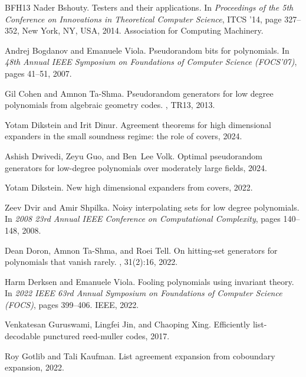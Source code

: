\documentclass[10pt,a4paper]{article}
\begin{document}
\begin{thebibliography}{BFH{\etalchar{+}}13}
Nader Bshouty.
\newblock Testers and their applications.
\newblock In {\em Proceedings of the 5th Conference on Innovations in
  Theoretical Computer Science}, ITCS '14, page 327–352, New York, NY, USA,
  2014. Association for Computing Machinery.

Andrej Bogdanov and Emanuele Viola.
\newblock Pseudorandom bits for polynomials.
\newblock In {\em 48th Annual IEEE Symposium on Foundations of Computer Science
  (FOCS'07)}, pages 41--51, 2007.

Gil Cohen and Amnon Ta-Shma.
\newblock Pseudorandom generators for low degree polynomials from algebraic
  geometry codes.
, TR13, 2013.

Yotam Dikstein and Irit Dinur.
\newblock Agreement theorems for high dimensional expanders in the small
  soundness regime: the role of covers, 2024.

Ashish Dwivedi, Zeyu Guo, and Ben~Lee Volk.
\newblock Optimal pseudorandom generators for low-degree polynomials over
  moderately large fields, 2024.

Yotam Dikstein.
\newblock New high dimensional expanders from covers, 2022.

Zeev Dvir and Amir Shpilka.
\newblock Noisy interpolating sets for low degree polynomials.
\newblock In {\em 2008 23rd Annual IEEE Conference on Computational
  Complexity}, pages 140--148, 2008.

Dean Doron, Amnon Ta{-}Shma, and Roei Tell.
\newblock On hitting-set generators for polynomials that vanish rarely.
, 31(2):16, 2022.

Harm Derksen and Emanuele Viola.
\newblock Fooling polynomials using invariant theory.
\newblock In {\em 2022 IEEE 63rd Annual Symposium on Foundations of Computer
  Science (FOCS)}, pages 399--406. IEEE, 2022.

Venkatesan Guruswami, Lingfei Jin, and Chaoping Xing.
\newblock Efficiently list-decodable punctured reed-muller codes, 2017.

Roy Gotlib and Tali Kaufman.
\newblock List agreement expansion from coboundary expansion, 2022.


\end{thebibliography}
\end{document}
